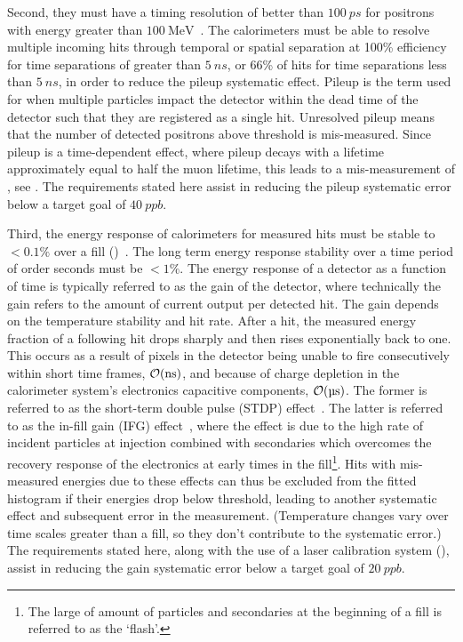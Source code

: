 Second, they must have a timing resolution of better than $\SI{100}{ps}$ for positrons with energy greater than $\SI{100}{\MeV}$~\cite{TDR}. The calorimeters must be able to resolve multiple incoming hits through temporal or spatial separation at 100\% efficiency for time separations of greater than $\SI{5}{ns}$, or 66\% of hits for time separations less than $\SI{5}{ns}$, in order to reduce the pileup systematic effect. Pileup is the term used for when multiple particles impact the detector within the dead time of the detector such that they are registered as a single hit. Unresolved pileup means that the number of detected positrons above threshold is mis-measured. Since pileup is a time-dependent effect, where pileup decays with a lifetime approximately equal to half the muon lifetime, this leads to a mis-measurement of \wa, see . The requirements stated here assist in reducing the pileup systematic error below a target goal of $\SI{40}{ppb}$.

Third, the energy response of calorimeters for measured hits must be stable to $< 0.1\%$ over a fill ()~\cite{TDR}. The long term energy response stability over a time period of order seconds must be $< 1\%$. The energy response of a detector as a function of time is typically referred to as the gain of the detector, where technically the gain refers to the amount of current output per detected hit. The gain depends on the temperature stability and hit rate. After a hit, the measured energy fraction of a following hit drops sharply and then rises exponentially back to one. This occurs as a result of pixels in the detector being unable to fire consecutively within short time frames, $\mathcal{O}(\SI{}{ns})$, and because of charge depletion in the calorimeter system's electronics capacitive components, $\mathcal{O}(\SI{}{\micro s})$. The former is referred to as the short-term double pulse (STDP) effect~\cite{STDP}. The latter is referred to as the in-fill gain (IFG) effect~\cite{IFG}, where the effect is due to the high rate of incident particles at injection combined with secondaries which overcomes the recovery response of the electronics at early times in the fill\footnote{The large of amount of particles and secondaries at the beginning of a fill is referred to as the `flash'.}. Hits with mis-measured energies due to these effects can thus be excluded from the fitted histogram if their energies drop below threshold, leading to another systematic effect and subsequent error in the \wa measurement. (Temperature changes vary over time scales greater than a fill, so they don't contribute to the systematic error.) The requirements stated here, along with the use of a laser calibration system (), assist in reducing the gain systematic error below a target goal of $\SI{20}{ppb}$.



